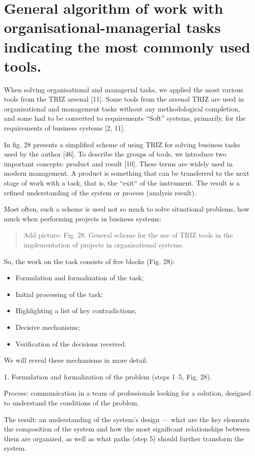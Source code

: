 \documentclass[11pt,a4paper]{book}
\newcommand{\addpicture}[1]{
  \begin{quote} Add picture: #1\end{quote}
}
\begin{document}
\section{General algorithm of work with organisational-managerial tasks
  indicating the most commonly used tools.} 

When solving organisational and managerial tasks, we applied the most various
tools from the TRIZ arsenal [11]. Some tools from the arsenal TRIZ are used in
organisational and management tasks without any methodological completion, and
some had to be converted to requirements “Soft” systems, primarily, for the
requirements of business systems [2, 11].

In fig. 28 presents a simplified scheme of using TRIZ for solving business
tasks used by the author [46]. To describe the groups of tools, we introduce
two important concepts: product and result [10]. These terms are widely used
in modern management. A product is something that can be transferred to the
next stage of work with a task, that is, the “exit“ of the instrument. The
result is a refined understanding of the system or process (analysis result).

Most often, such a scheme is used not so much to solve situational problems,
how much when performing projects in business systems:

\addpicture{Fig. 28. General scheme for the use of TRIZ tools in the
  implementation of projects in organisational systems.}

So, the work on the task consists of five blocks (Fig. 28):
\begin{itemize}[noitemsep]
\item Formulation and formalization of the task;
\item Initial processing of the task;
\item Highlighting a list of key contradictions;
\item Decisive mechanisms;
\item Verification of the decisions received.
\end{itemize}
We will reveal these mechanisms in more detail.

1. Formulation and formalization of the problem (steps 1–5, Fig. 28).

Process: communication in a team of professionals looking for a solution,
designed to understand the conditions of the problem.

The result: an understanding of the system’s design — what are the key
elements the composition of the system and how the most significant
relationships between them are organized, as well as what paths (step 5)
should further transform the system.
\end{document}
